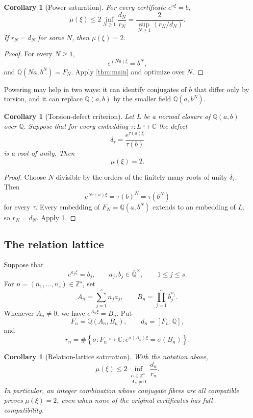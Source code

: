 \documentclass[11pt]{article}
\newcommand{\CC}{\mathbb C}
\newcommand{\QQ}{\mathbb Q}
\newcommand{\ZZ}{\mathbb Z}
\newcommand{\Qbar}{\overline{\mathbb Q}}
\newtheorem{corollary}[theorem]{Corollary}
\theoremstyle{definition}
\theoremstyle{remark}
\numberwithin{equation}{section}
\begin{document}
\begin{corollary}[Power saturation]\label{cor:powers}
For every certificate $e^{a\xi}=b$,
\[
 \boxed{
 \mu(\xi)\le
 2\inf_{N\ge1}\frac{d_N}{r_N}
 =\frac{2}{\sup_{N\ge1}(r_N/d_N)}.}
\]
If $r_N=d_N$ for some $N$, then $\mu(\xi)=2$.
\end{corollary}

\begin{proof}
For every $N\ge1$,
\[
 e^{(Na)\xi}=b^N,
\]
and $\QQ(Na,b^N)=F_N$.  Apply \cref{thm:main} and optimize over $N$.
\end{proof}

Powering may help in two ways: it can identify conjugates of $b$ that
differ only by torsion, and it can replace $\QQ(a,b)$ by the smaller
field $\QQ(a,b^N)$.

\begin{corollary}[Torsion-defect criterion]\label{cor:torsion}
Let $L$ be a normal closure of $\QQ(a,b)$ over $\QQ$.  Suppose that for
every embedding $\tau:L\hookrightarrow\CC$ the defect
\begin{equation}\label{eq:defect}
 \delta_\tau=\frac{e^{\tau(a)\xi}}{\tau(b)}
\end{equation}
is a root of unity.  Then
\[
 \boxed{\mu(\xi)=2}.
\]
\end{corollary}

\begin{proof}
Choose $N$ divisible by the orders of the finitely many roots of unity
$\delta_\tau$.  Then
\[
 e^{N\tau(a)\xi}=\tau(b)^N=\tau(b^N)
\]
for every $\tau$.  Every embedding of $F_N=\QQ(a,b^N)$ extends to an
embedding of $L$, so $r_N=d_N$.  Apply \cref{cor:powers}.
\end{proof}

\subsection{The relation lattice}

Suppose that
\[
 e^{a_j\xi}=b_j,
 \qquad a_j,b_j\in\Qbar^\times,
 \qquad 1\le j\le s.
\]
For $n=(n_1,\ldots,n_s)\in\ZZ^s$, set
\begin{equation}\label{eq:relation-combination}
 A_n=\sum_{j=1}^s n_ja_j,
 \qquad
 B_n=\prod_{j=1}^s b_j^{n_j}.
\end{equation}
Whenever $A_n\ne0$, we have $e^{A_n\xi}=B_n$.  Put
\[
 F_n=\QQ(A_n,B_n),\qquad d_n=[F_n:\QQ],
\]
and
\[
 r_n=\#\left\{\sigma:F_n\hookrightarrow\CC:
 e^{\sigma(A_n)\xi}=\sigma(B_n)\right\}.
\]

\begin{corollary}[Relation-lattice saturation]\label{cor:relations}
With the notation above,
\[
 \boxed{
 \mu(\xi)\le
 2\inf_{\substack{n\in\ZZ^s\\A_n\ne0}}
 \frac{d_n}{r_n}.}
\]
In particular, an integer combination whose conjugate fibres are all
compatible proves $\mu(\xi)=2$, even when none of the original
certificates has full compatibility.
\end{corollary}
\end{document}
